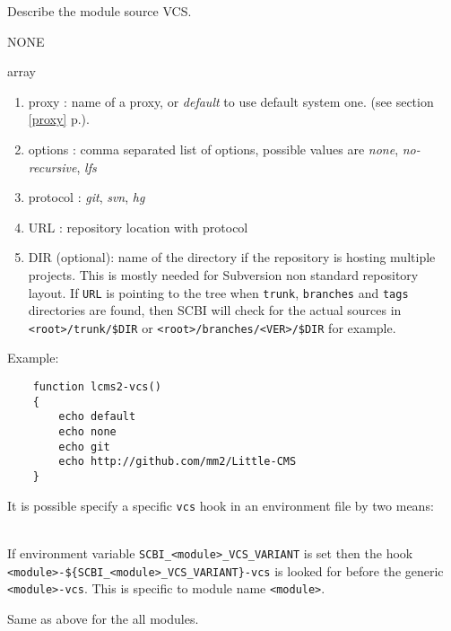 \documentclass[a4paper,12pt,twoside]{article}
\newcommand{\code}[1]{\texttt{#1}}
\renewcommand{\emph}[1]{\textit{#1}}
\newcommand{\seeref}[1]{see section \ref{#1} p.\pageref{#1}}
\begin{document}
\begin{description}[font=\large\texttt]

	\item[<module>{[}-<variant>{]}-vcs] Describe the module source VCS.
	\begin{description}[font=\textit,style=standard]
		\item[parameter] \tabto{2cm} NONE
		\item[return] \tabto{2cm} array
		\begin{enumerate}
			\item proxy : name of a proxy, or \emph{default} to use default system one. (\seeref{proxy}).
			\item options : comma separated list of options, possible values are \emph{none}, \emph{no-recursive}, \emph{lfs}
			\item protocol : \emph{git}, \emph{svn}, \emph{hg}
			\item URL : repository location with protocol
			\item DIR (optional): name of the directory if the repository is hosting multiple projects. This is mostly needed for Subversion non standard repository layout. If \code{URL} is pointing to the tree when \code{trunk}, \code{branches} and \code{tags} directories are found, then SCBI will check for the actual sources in \code{<root>/trunk/\$DIR} or \code{<root>/branches/<VER>/\$DIR} for example.
		\end{enumerate}
	\end{description}

	Example:
	\begin{lstlisting}
	function lcms2-vcs()
	{
		echo default
		echo none
		echo git
		echo http://github.com/mm2/Little-CMS
	}
	\end{lstlisting}

	It is possible specify a specific \code{vcs} hook in an environment file by two means:

	\begin{description}[style=standard]
		\item[\code{SCBI\_<module>\_VCS\_VARIANT}] \hfill \\
		If environment variable \code{SCBI\_<module>\_VCS\_VARIANT} is set then the hook \\ \code{<module>-\$\{SCBI\_<module>\_VCS\_VARIANT\}-vcs} is looked for before the generic \code{<module>-vcs}. This is specific to module name \code{<module>}.

		\item[\code{SCBI\_VCS\_VARIANT}] Same as above for the all modules.
	\end{description}


\end{description}
\end{document}
